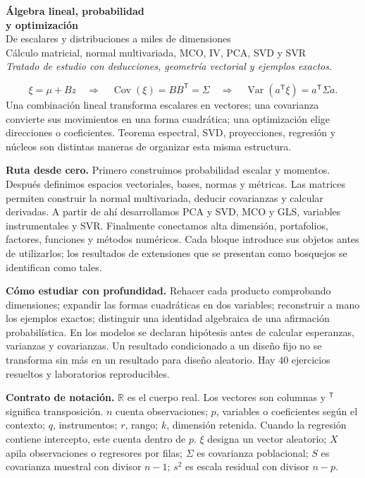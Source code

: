 \documentclass[11pt,a4paper]{article}
\newcommand{\R}{\mathbb R}
\newcommand{\T}{^{\mathsf T}}
\DeclareMathOperator{\Var}{Var}
\DeclareMathOperator{\Cov}{Cov}
\theoremstyle{definition}
\begin{document}
\begin{center}
{\Huge\bfseries\color{azul}Álgebra lineal, probabilidad\\[3pt]y optimización}\\[7pt]
{\Large De escalares y distribuciones a miles de dimensiones}\\[4pt]
{\large Cálculo matricial, normal multivariada, MCO, IV, PCA, SVD y SVR}\\[6pt]
\textit{Tratado de estudio con deducciones, geometría vectorial y ejemplos exactos.}
\end{center}
\begin{idea}
\[
\boxed{\xi=\mu+Bz}
\quad\Longrightarrow\quad
\boxed{\Cov(\xi)=BB\T=\Sigma}
\quad\Longrightarrow\quad
\boxed{\Var(a\T\xi)=a\T\Sigma a}.
\]
Una combinación lineal transforma escalares en vectores; una covarianza convierte sus movimientos en una forma cuadrática; una optimización elige direcciones o coeficientes. Teorema espectral, SVD, proyecciones, regresión y núcleos son distintas maneras de organizar esta misma estructura.
\end{idea}
\textbf{Ruta desde cero.} Primero construimos probabilidad escalar y momentos. Después definimos espacios vectoriales, bases, normas y métricas. Las matrices permiten construir la normal multivariada, deducir covarianzas y calcular derivadas. A partir de ahí desarrollamos PCA y SVD, MCO y GLS, variables instrumentales y SVR. Finalmente conectamos alta dimensión, portafolios, factores, funciones y métodos numéricos. Cada bloque introduce sus objetos antes de utilizarlos; los resultados de extensiones que se presentan como bosquejos se identifican como tales.

\textbf{Cómo estudiar con profundidad.} Rehacer cada producto comprobando dimensiones; expandir las formas cuadráticas en dos variables; reconstruir a mano los ejemplos exactos; distinguir una identidad algebraica de una afirmación probabilística. En los modelos se declaran hipótesis antes de calcular esperanzas, varianzas y covarianzas. Un resultado condicionado a un diseño fijo no se transforma sin más en un resultado para diseño aleatorio. Hay 40 ejercicios resueltos y laboratorios reproducibles.

\textbf{Contrato de notación.} $\R$ es el cuerpo real. Los vectores son columnas y $\T$ significa transposición. $n$ cuenta observaciones; $p$, variables o coeficientes según el contexto; $q$, instrumentos; $r$, rango; $k$, dimensión retenida. Cuando la regresión contiene intercepto, este cuenta dentro de $p$. $\xi$ designa un vector aleatorio; $X$ apila observaciones o regresores por filas; $\Sigma$ es covarianza poblacional; $S$ es covarianza muestral con divisor $n-1$; $s^2$ es escala residual con divisor $n-p$.
\end{document}
